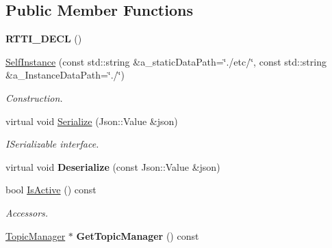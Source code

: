 \subsection*{Public Member Functions}
\begin{DoxyCompactItemize}
\item 
\mbox{\label{class_self_instance_a23539b3ec37014d479396edc909c3042}} 
{\bfseries R\+T\+T\+I\+\_\+\+D\+E\+CL} ()
\item 
\mbox{\label{class_self_instance_aa25dfe599222ab2755096a639d289086}} 
\hyperlink{class_self_instance_aa25dfe599222ab2755096a639d289086}{Self\+Instance} (const std\+::string \&a\+\_\+static\+Data\+Path=\char`\"{}./etc/\char`\"{}, const std\+::string \&a\+\_\+\+Instance\+Data\+Path=\char`\"{}./\char`\"{})
\begin{DoxyCompactList}\small\item\em Construction. \end{DoxyCompactList}\item 
\mbox{\label{class_self_instance_aa9d471e1337c32bb4d1bf6d55868a1f1}} 
virtual void \hyperlink{class_self_instance_aa9d471e1337c32bb4d1bf6d55868a1f1}{Serialize} (Json\+::\+Value \&json)
\begin{DoxyCompactList}\small\item\em I\+Serializable interface. \end{DoxyCompactList}\item 
\mbox{\label{class_self_instance_a5078af30738fff70b2eafc5438909590}} 
virtual void {\bfseries Deserialize} (const Json\+::\+Value \&json)
\item 
\mbox{\label{class_self_instance_a2ced01ef55817d35ef0f087ad8dc7a10}} 
bool \hyperlink{class_self_instance_a2ced01ef55817d35ef0f087ad8dc7a10}{Is\+Active} () const
\begin{DoxyCompactList}\small\item\em Accessors. \end{DoxyCompactList}\item 
\mbox{\label{class_self_instance_a02263295ff2e0504ed57768953ab101d}} 
\hyperlink{class_topic_manager}{Topic\+Manager} $\ast$ {\bfseries Get\+Topic\+Manager} () const

\end{DoxyCompactItemize}
